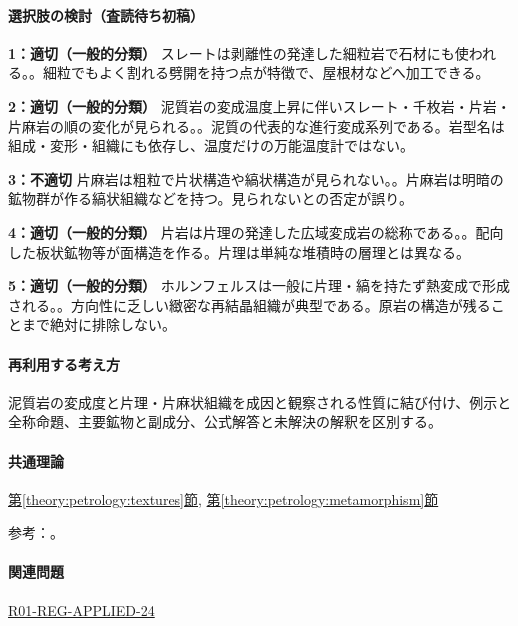 \paragraph{選択肢の検討（査読待ち初稿）}\mbox{}\par

\noindent\textbf{1：適切（一般的分類）} スレートは剥離性の発達した細粒岩で石材にも使われる。。細粒でもよく割れる劈開を持つ点が特徴で、屋根材などへ加工できる。\par

\noindent\textbf{2：適切（一般的分類）} 泥質岩の変成温度上昇に伴いスレート・千枚岩・片岩・片麻岩の順の変化が見られる。。泥質の代表的な進行変成系列である。岩型名は組成・変形・組織にも依存し、温度だけの万能温度計ではない。\par

\noindent\textbf{3：不適切} 片麻岩は粗粒で片状構造や縞状構造が見られない。。片麻岩は明暗の鉱物群が作る縞状組織などを持つ。見られないとの否定が誤り。\par

\noindent\textbf{4：適切（一般的分類）} 片岩は片理の発達した広域変成岩の総称である。。配向した板状鉱物等が面構造を作る。片理は単純な堆積時の層理とは異なる。\par

\noindent\textbf{5：適切（一般的分類）} ホルンフェルスは一般に片理・縞を持たず熱変成で形成される。。方向性に乏しい緻密な再結晶組織が典型である。原岩の構造が残ることまで絶対に排除しない。\par

\paragraph{再利用する考え方} 泥質岩の変成度と片理・片麻状組織を成因と観察される性質に結び付け、例示と全称命題、主要鉱物と副成分、公式解答と未解決の解釈を区別する。

\paragraph{共通理論} \hyperref[theory:petrology:textures]{第\ref*{theory:petrology:textures}節}, \hyperref[theory:petrology:metamorphism]{第\ref*{theory:petrology:metamorphism}節}

\par 参考：\cite{gsj_metamorphic_words,nelson_regional2011}。

\paragraph{関連問題} \hyperref[q:r01-reg-applied-24]{R01-REG-APPLIED-24}

